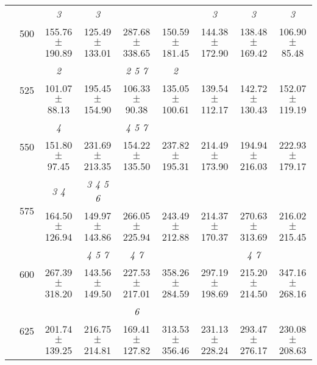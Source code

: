 \begin{table}[h]
{\begin{tabular}{
        ccccccccc}
 & \multirow{2}{*}{500}& \textit{ 3 }& \textit{ 3 }& & & \textit{ 3 }& \textit{ 3 }& \textit{ 3 } \\ 
 & & 155.76 $\pm$ 190.89& 125.49 $\pm$ 133.01& 287.68 $\pm$ 338.65& 150.59 $\pm$ 181.45& 144.38 $\pm$ 172.90& 138.48 $\pm$ 169.42& 106.90 $\pm$ 85.48 \\ 
 & \multirow{2}{*}{525}& \cellcolor[HTML]{EFEFEF} \textit{ 2 }& \cellcolor[HTML]{EFEFEF} & \cellcolor[HTML]{EFEFEF} \textit{ 2 5 7 }& \cellcolor[HTML]{EFEFEF} \textit{ 2 }& \cellcolor[HTML]{EFEFEF} & \cellcolor[HTML]{EFEFEF} & \cellcolor[HTML]{EFEFEF}  \\ 
 & & \cellcolor[HTML]{EFEFEF} 101.07 $\pm$ 88.13& \cellcolor[HTML]{EFEFEF} 195.45 $\pm$ 154.90& \cellcolor[HTML]{EFEFEF} 106.33 $\pm$ 90.38& \cellcolor[HTML]{EFEFEF} 135.05 $\pm$ 100.61& \cellcolor[HTML]{EFEFEF} 139.54 $\pm$ 112.17& \cellcolor[HTML]{EFEFEF} 142.72 $\pm$ 130.43& \cellcolor[HTML]{EFEFEF} 152.07 $\pm$ 119.19 \\ 
 & \multirow{2}{*}{550}& \textit{ 4 }& & \textit{ 4 5 7 }& & & &  \\ 
 & & 151.80 $\pm$ 97.45& 231.69 $\pm$ 213.35& 154.22 $\pm$ 135.50& 237.82 $\pm$ 195.31& 214.49 $\pm$ 173.90& 194.94 $\pm$ 216.03& 222.93 $\pm$ 179.17 \\ 
 & \multirow{2}{*}{575}& \cellcolor[HTML]{EFEFEF} \textit{ 3 4 }& \cellcolor[HTML]{EFEFEF} \textit{ 3 4 5 6 }& \cellcolor[HTML]{EFEFEF} & \cellcolor[HTML]{EFEFEF} & \cellcolor[HTML]{EFEFEF} & \cellcolor[HTML]{EFEFEF} & \cellcolor[HTML]{EFEFEF}  \\ 
 & & \cellcolor[HTML]{EFEFEF} 164.50 $\pm$ 126.94& \cellcolor[HTML]{EFEFEF} 149.97 $\pm$ 143.86& \cellcolor[HTML]{EFEFEF} 266.05 $\pm$ 225.94& \cellcolor[HTML]{EFEFEF} 243.49 $\pm$ 212.88& \cellcolor[HTML]{EFEFEF} 214.37 $\pm$ 170.37& \cellcolor[HTML]{EFEFEF} 270.63 $\pm$ 313.69& \cellcolor[HTML]{EFEFEF} 216.02 $\pm$ 215.45 \\ 
 & \multirow{2}{*}{600}& & \textit{ 4 5 7 }& \textit{ 4 7 }& & & \textit{ 4 7 }&  \\ 
 & & 267.39 $\pm$ 318.20& 143.56 $\pm$ 149.50& 227.53 $\pm$ 217.01& 358.26 $\pm$ 284.59& 297.19 $\pm$ 198.69& 215.20 $\pm$ 214.50& 347.16 $\pm$ 268.16 \\ 
 & \multirow{2}{*}{625}& \cellcolor[HTML]{EFEFEF} & \cellcolor[HTML]{EFEFEF} & \cellcolor[HTML]{EFEFEF} \textit{ 6 }& \cellcolor[HTML]{EFEFEF} & \cellcolor[HTML]{EFEFEF} & \cellcolor[HTML]{EFEFEF} & \cellcolor[HTML]{EFEFEF}  \\ 
 & & \cellcolor[HTML]{EFEFEF} 201.74 $\pm$ 139.25& \cellcolor[HTML]{EFEFEF} 216.75 $\pm$ 214.81& \cellcolor[HTML]{EFEFEF} 169.41 $\pm$ 127.82& \cellcolor[HTML]{EFEFEF} 313.53 $\pm$ 356.46& \cellcolor[HTML]{EFEFEF} 231.13 $\pm$ 228.24& \cellcolor[HTML]{EFEFEF} 293.47 $\pm$ 276.17& \cellcolor[HTML]{EFEFEF} 230.08 $\pm$ 208.63 \\ 

\end{tabular}}
\end{table}
